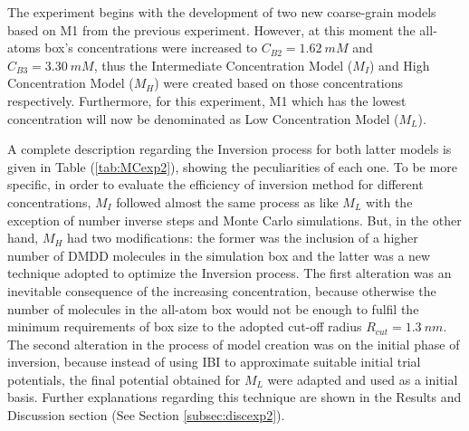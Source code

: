 \documentclass[10pt,a4paper,twoside]{article}
\begin{document}
 The experiment begins with the development of two new coarse-grain models based on M1 from the previous experiment. However, at this moment the all-atoms box's concentrations were increased to $C_{B2} = 1.62\ mM$ and $C_{B3} = 3.30\ mM$, thus the Intermediate Concentration Model ($M_{I}$) and High Concentration Model ($M_{H}$) were created based on those concentrations respectively. Furthermore, for this experiment, M1 which has the lowest concentration will now be denominated as Low Concentration Model ($M_{L}$).
 
  A complete description regarding the Inversion process for both latter models is given in Table (\ref{tab:MCexp2}), showing the peculiarities of each one. To be more specific, in order to evaluate the efficiency of inversion method for different concentrations, $M_{I}$ followed almost the same process as like $M_{L}$ with the exception of number inverse steps and Monte Carlo simulations. But, in the other hand, $M_{H}$ had two modifications: the former was the inclusion of a higher number of DMDD molecules in the simulation box and the latter was a new technique adopted to optimize the Inversion process. The first alteration was an inevitable consequence of the increasing  concentration, because otherwise the number of molecules in the all-atom box would not be enough to fulfil the minimum requirements of box size to the adopted cut-off radius $R_{cut} = 1.3 \ nm$. The second alteration in the process of model creation was on the initial phase of inversion, because instead of using IBI to approximate suitable initial trial potentials, the final potential obtained for $M_{L}$ were adapted and used as a initial basis. Further explanations regarding this technique are shown in  the Results and Discussion section (See Section \ref{subsec:discexp2}).
\end{document}
